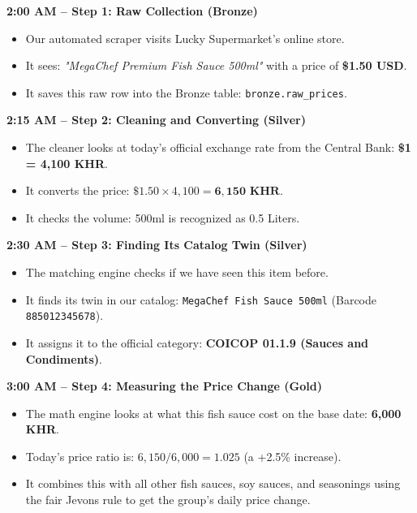 \documentclass[11pt,a4paper,oneside]{article}
\begin{document}
\begin{center}
\begin{tcolorbox}[colback=white,colframe=NavyBlue,width=0.95\textwidth,title=\bfseries The 5 Steps in the Life of a Price]
\small
\textbf{2:00 AM -- Step 1: Raw Collection (Bronze)}
\begin{itemize}[noitemsep]
    \item Our automated scraper visits Lucky Supermarket's online store.
    \item It sees: \textit{"MegaChef Premium Fish Sauce 500ml"} with a price of \textbf{\$1.50 USD}.
    \item It saves this raw row into the Bronze table: \texttt{bronze.raw\_prices}.
\end{itemize}

\textbf{2:15 AM -- Step 2: Cleaning and Converting (Silver)}
\begin{itemize}[noitemsep]
    \item The cleaner looks at today's official exchange rate from the Central Bank: \textbf{\$1 = 4,100 KHR}.
    \item It converts the price: $\$1.50 \times 4,100 = \mathbf{6,150\text{ KHR}}$.
    \item It checks the volume: 500ml is recognized as 0.5 Liters.
\end{itemize}

\textbf{2:30 AM -- Step 3: Finding Its Catalog Twin (Silver)}
\begin{itemize}[noitemsep]
    \item The matching engine checks if we have seen this item before.
    \item It finds its twin in our catalog: \texttt{MegaChef Fish Sauce 500ml} (Barcode \texttt{885012345678}).
    \item It assigns it to the official category: \textbf{COICOP 01.1.9 (Sauces and Condiments)}.
\end{itemize}

\textbf{3:00 AM -- Step 4: Measuring the Price Change (Gold)}
\begin{itemize}[noitemsep]
    \item The math engine looks at what this fish sauce cost on the base date: \textbf{6,000 KHR}.
    \item Today's price ratio is: $6,150 / 6,000 = \mathbf{1.025}$ (a +2.5\% increase).
    \item It combines this with all other fish sauces, soy sauces, and seasonings using the fair Jevons rule to get the group's daily price change.
\end{itemize}


\end{tcolorbox}
\end{center}
\end{document}

